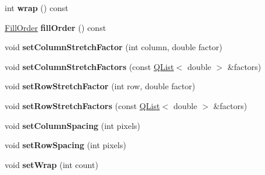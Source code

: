 \begin{DoxyCompactItemize}
\item 
int {\bfseries wrap} () const \hypertarget{class_q_c_p_layout_grid_aa7fc0bff4591a6be44af2fb038dd85d9}{}\label{class_q_c_p_layout_grid_aa7fc0bff4591a6be44af2fb038dd85d9}

\item 
\hyperlink{class_q_c_p_layout_grid_a7d49ee08773de6b2fd246edfed353cca}{Fill\+Order} {\bfseries fill\+Order} () const \hypertarget{class_q_c_p_layout_grid_a2ed8e2fc298652ec67d6a8848e58bad1}{}\label{class_q_c_p_layout_grid_a2ed8e2fc298652ec67d6a8848e58bad1}

\item 
void {\bfseries set\+Column\+Stretch\+Factor} (int column, double factor)\hypertarget{class_q_c_p_layout_grid_ae38f31a71687b9d7ee3104852528fb50}{}\label{class_q_c_p_layout_grid_ae38f31a71687b9d7ee3104852528fb50}

\item 
void {\bfseries set\+Column\+Stretch\+Factors} (const \hyperlink{class_q_list}{Q\+List}$<$ double $>$ \&factors)\hypertarget{class_q_c_p_layout_grid_a6c2591d1a7e2534ce036989543b49e57}{}\label{class_q_c_p_layout_grid_a6c2591d1a7e2534ce036989543b49e57}

\item 
void {\bfseries set\+Row\+Stretch\+Factor} (int row, double factor)\hypertarget{class_q_c_p_layout_grid_a7b0273de5369bd93d942edbaf5b166ec}{}\label{class_q_c_p_layout_grid_a7b0273de5369bd93d942edbaf5b166ec}

\item 
void {\bfseries set\+Row\+Stretch\+Factors} (const \hyperlink{class_q_list}{Q\+List}$<$ double $>$ \&factors)\hypertarget{class_q_c_p_layout_grid_a200b45f9c908f96ebadaa3c8d87a2782}{}\label{class_q_c_p_layout_grid_a200b45f9c908f96ebadaa3c8d87a2782}

\item 
void {\bfseries set\+Column\+Spacing} (int pixels)\hypertarget{class_q_c_p_layout_grid_a3a49272aba32bb0fddc3bb2a45a3dba0}{}\label{class_q_c_p_layout_grid_a3a49272aba32bb0fddc3bb2a45a3dba0}

\item 
void {\bfseries set\+Row\+Spacing} (int pixels)\hypertarget{class_q_c_p_layout_grid_aaef2cd2d456197ee06a208793678e436}{}\label{class_q_c_p_layout_grid_aaef2cd2d456197ee06a208793678e436}

\item 
void {\bfseries set\+Wrap} (int count)\hypertarget{class_q_c_p_layout_grid_ab36af18d77e4428386d02970382ee598}{}\label{class_q_c_p_layout_grid_ab36af18d77e4428386d02970382ee598}


\end{DoxyCompactItemize}
